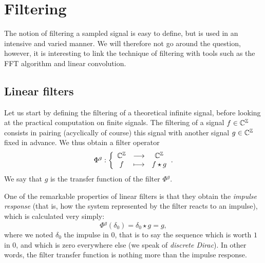 \section{Filtering}
\label{sect1-filtering} 
 
 The notion of filtering a sampled signal is easy to define, but is used in an intensive and varied manner. We will therefore not go around the question, however, it is interesting to link the technique of filtering with tools such as the FFT algorithm and linear convolution.
\subsection{Linear filters}
\label{sec2-linear-filters} 
 
 
 \label{notation-53} Let us start by defining the filtering of a theoretical infinite signal, before looking at the practical computation on finite signals. The filtering of a signal $ f \in \mathbb{C}^{\mathbb{Z}} $ consists in pairing (acyclically of course) this signal with another signal $ g \in \mathbb{C}^{\mathbb{Z}} $ fixed in advance. We thus obtain a filter operator
\begin{equation*}
\Phi^g: {\left\{ \begin{array}{ccc} \mathbb{C}^{\mathbb{Z}} & \longrightarrow & \mathbb{C}^{\mathbb{Z}} \\ f & \longmapsto & f \star g \end{array} \right.}.
\end{equation*}
 We say that $ g $ is the transfer function of the filter $ \Phi^g $.
 
 
 One of the remarkable properties of linear filters is that they obtain the \textit{impulse response} (that is, how the system represented by the filter reacts to an impulse), which is calculated very simply:
\begin{equation*}
\Phi^g (\delta_0) = \delta_0 \star g = g,
\end{equation*}
where we noted $ \delta_0 $ the impulse in $ 0 $, that is to say the sequence which is worth $ 1 $ in $ 0 $, and which is zero everywhere else (we speak of \textit{discrete Dirac}). In other words, the filter transfer function is nothing more than the impulse response.
 
